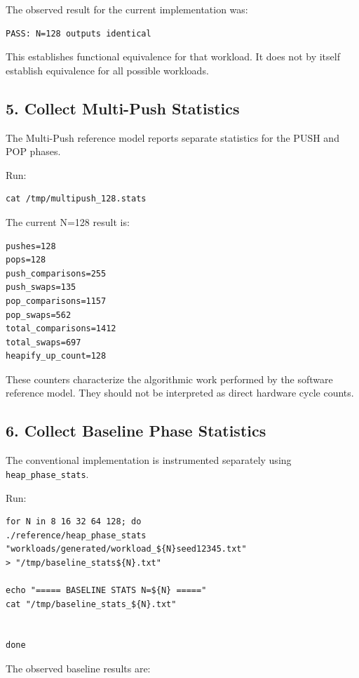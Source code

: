 \documentclass[11pt,a4paper]{article}
\begin{document}
The observed result for the current implementation was:

\begin{lstlisting}
PASS: N=128 outputs identical
\end{lstlisting}

This establishes functional equivalence for that workload. It does not
by itself establish equivalence for all possible workloads.

\subsection{5. Collect Multi-Push Statistics}

The Multi-Push reference model reports separate statistics for the PUSH
and POP phases.

Run:

\begin{lstlisting}
cat /tmp/multipush_128.stats
\end{lstlisting}

The current N=128 result is:

\begin{lstlisting}
pushes=128
pops=128
push_comparisons=255
push_swaps=135
pop_comparisons=1157
pop_swaps=562
total_comparisons=1412
total_swaps=697
heapify_up_count=128
\end{lstlisting}

These counters characterize the algorithmic work performed by the
software reference model. They should not be interpreted as direct
hardware cycle counts.

\subsection{6. Collect Baseline Phase Statistics}

The conventional implementation is instrumented separately using
\texttt{heap_phase_stats}.

Run:

\begin{lstlisting}
for N in 8 16 32 64 128; do
./reference/heap_phase_stats
"workloads/generated/workload_${N}seed12345.txt"
> "/tmp/baseline_stats${N}.txt"

echo "===== BASELINE STATS N=${N} ====="
cat "/tmp/baseline_stats_${N}.txt"


done
\end{lstlisting}

The observed baseline results are:
\end{document}
